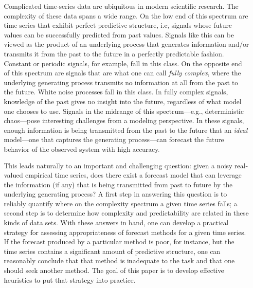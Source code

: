 %
Complicated time-series data are ubiquitous in modern scientific
research.  The complexity of these data spans a wide range.  On the
low end of this spectrum are time series that exhibit perfect
predictive structure, i.e, signals whose future values can be
successfully predicted from past values.  Signals like this can be
viewed as the product of an underlying process that generates
information and/or transmits it from the past to the future in a
perfectly predictable fashion.  Constant or periodic signals, for
example, fall in this class.  On the opposite end of this spectrum are
signals that are what one can call \emph{fully complex}, where the
underlying generating process transmits no information at all from the
past to the future.  White noise processes fall in this class.  In
fully complex signals, knowledge of the past gives no insight into the
future, regardless of what model one chooses to use. Signals in the
midrange of this spectrum---e.g., deterministic chaos---pose
interesting challenges from a modeling perspective.  In these signals,
enough information is being transmitted from the past to the future
that an \emph{ideal} model---one that captures the generating
process---can forecast the future behavior of the observed system with
high accuracy. 


This leads naturally to an important and challenging question: given a
noisy real-valued empirical time series, does there exist a forecast
model that can leverage the information (if any) that is being
transmitted from past to future by the underlying generating process?
A first step in answering this question is to reliably quantify where
on the complexity spectrum a given time series falls; a second step is
to determine how complexity and predictability are related in these
kinds of data sets.  With these answers in hand, one can develop a
practical strategy for assessing appropriateness of forecast methods
for a given time series.  If the forecast produced by a particular
method is poor, for instance, but the time series contains a
significant amount of predictive structure, one can reasonably
conclude that that method is inadequate to the task and that one
should seek another method.  The goal of this paper is to develop
effective heuristics to put that strategy into practice.

